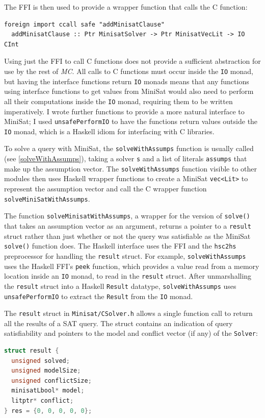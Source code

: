 \documentclass[12pt,a4paper,twoside,openright]{report}
\begin{document}
{{The FFI is then used to provide a wrapper function that calls
the C function:
\begin{lstlisting}
foreign import ccall safe "addMinisatClause"
  addMinisatClause :: Ptr MinisatSolver -> Ptr MinisatVecLit -> IO CInt
\end{lstlisting}

Using just the FFI to call C functions does not provide a
sufficient abstraction for use by the rest of \emph{MC}. All
calls to C functions must occur inside the \verb,IO, monad, but having
the interface functions return \verb,IO, monads means that any functions
using interface functions to get values from MiniSat would also need to
perform all their computations inside the \verb,IO, monad, requiring them to
be written imperatively.
I wrote further functions to provide a more natural interface to MiniSat;
I used \verb,unsafePerformIO, to have the functions return
values outside the \verb,IO, monad, which is a Haskell idiom for
interfacing with C libraries.

To solve a query with MiniSat, the \verb,solveWithAssumps, function
is usually called (see \ref{solveWithAssumps}),
taking a solver \verb,s, and a list of literals \verb,assumps,
that make up the assumption vector. The \verb,solveWithAssumps, function
visible to other modules then uses Haskell wrapper functions to create
a MiniSat \verb,vec<Lit>, to represent the assumption vector and call
the C wrapper function \verb,solveMiniSatWithAssumps,.

The function \verb,solveMinisatWithAssumps,, a wrapper for the version of \verb,solve(),
that takes an assumption vector as an argument, returns a pointer to a
\verb,result, struct rather than just whether or not the query was satisfiable
as the MiniSat \verb,solve(), function does.
The Haskell interface uses the FFI and the \verb,hsc2hs, preprocessor
for handling the \verb,result, struct. For example, \verb,solveWithAssumps,
uses the Haskell FFI's \verb,peek, function,
which provides a value read from a memory location inside
an \verb,IO, monad, to read in the \verb,result, struct. After unmarshalling
the \verb,result, struct into a Haskell \verb,Result, datatype, \verb,solveWithAssumps,
uses \verb,unsafePerformIO, to extract the \verb,Result, from the \verb,IO, monad.

The \verb,result, struct in \verb,Minisat/CSolver.h,
allows a single function call to return
all the results of a SAT query. The struct contains an indication of query satisfiability
and pointers to the model and conflict vector (if any) of the \verb,Solver,:
\begin{lstlisting}[language=C]
struct result {
  unsigned solved;
  unsigned modelSize;
  unsigned conflictSize;
  minisatLbool* model;
  litptr* conflict;
} res = {0, 0, 0, 0, 0};
\end{lstlisting}

}}
\end{document}

